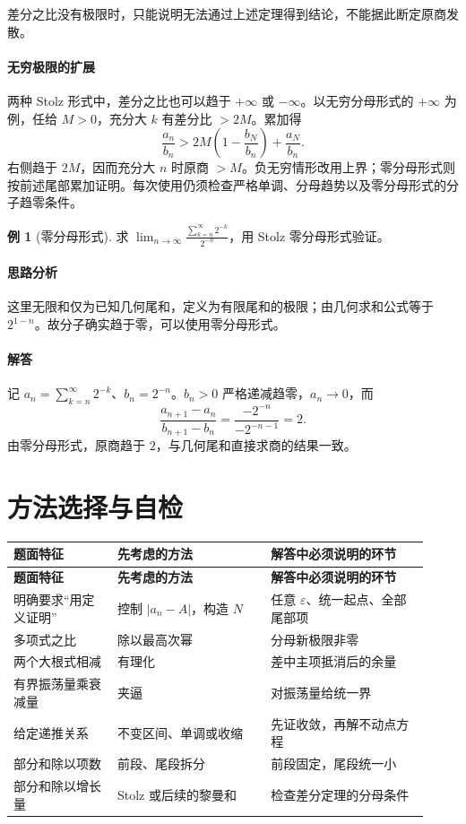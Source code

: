 \documentclass[UTF8,fontset=fandol,12pt,oneside,openany]{ctexrep}
\theoremstyle{definition}
\newtheorem{example}{例}[chapter]
\begin{document}
差分之比没有极限时，只能说明无法通过上述定理得到结论，不能据此断定原商发散。

\paragraph{无穷极限的扩展} 两种 Stolz 形式中，差分之比也可以趋于 $+\infty$ 或 $-\infty$。以无穷分母形式的 $+\infty$ 为例，任给 $M>0$，充分大 $k$ 有差分比 $>2M$。累加得
\[
\frac{a_n}{b_n}>
2M\left(1-\frac{b_N}{b_n}\right)+\frac{a_N}{b_n}.
\]
右侧趋于 $2M$，因而充分大 $n$ 时原商 $>M$。负无穷情形改用上界；零分母形式则按前述尾部累加证明。每次使用仍须检查严格单调、分母趋势以及零分母形式的分子趋零条件。

\begin{example}[零分母形式]
求 $\displaystyle\lim_{n\to\infty}\frac{\sum_{k=n}^{\infty}2^{-k}}{2^{-n}}$，用 Stolz 零分母形式验证。
\end{example}
\paragraph{思路分析} 这里无限和仅为已知几何尾和，定义为有限尾和的极限；由几何求和公式等于 $2^{1-n}$。故分子确实趋于零，可以使用零分母形式。
\paragraph{解答} 记 $a_n=\sum_{k=n}^{\infty}2^{-k}$、$b_n=2^{-n}$。$b_n>0$ 严格递减趋零，$a_n\to0$，而
\[
\frac{a_{n+1}-a_n}{b_{n+1}-b_n}
=\frac{-2^{-n}}{-2^{-n-1}}=2.
\]
由零分母形式，原商趋于 $2$，与几何尾和直接求商的结果一致。

\section{方法选择与自检}

{\small\begin{longtable}{>{\raggedright\arraybackslash}p{0.23\linewidth}>{\raggedright\arraybackslash}p{0.34\linewidth}>{\raggedright\arraybackslash}p{0.35\linewidth}}
\toprule
\textbf{题面特征} & \textbf{先考虑的方法} & \textbf{解答中必须说明的环节} \\
\midrule\endfirsthead
\toprule
\textbf{题面特征} & \textbf{先考虑的方法} & \textbf{解答中必须说明的环节} \\
\midrule\endhead
明确要求“用定义证明” & 控制 $|a_n-A|$，构造 $N$ & 任意 $\varepsilon$、统一起点、全部尾部项 \\
多项式之比 & 除以最高次幂 & 分母新极限非零 \\
两个大根式相减 & 有理化 & 差中主项抵消后的余量 \\
有界振荡量乘衰减量 & 夹逼 & 对振荡量给统一界 \\
给定递推关系 & 不变区间、单调或收缩 & 先证收敛，再解不动点方程 \\
部分和除以项数 & 前段、尾段拆分 & 前段固定，尾段统一小 \\
部分和除以增长量 & Stolz 或后续的黎曼和 & 检查差分定理的分母条件 \\
\bottomrule\end{longtable}}
\end{document}
